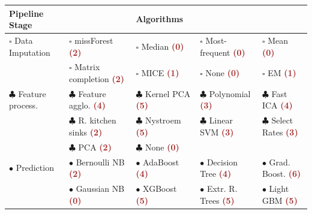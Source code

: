 \documentclass [PhD] {uclathes}
\begin{document}
\begin{table}[t]%
\centering
\begin{tabular}{|l||llll|}
\hline
{\bf {\footnotesize Pipeline Stage}} & & {\footnotesize {\bf Algorithms}}& &   \\
\hline
\hline
{\tiny \bf $\square$} {\footnotesize Data Imputation} & {\tiny $\square$} {\footnotesize missForest {\bf \textcolor{brown}{(2)}}} & {\tiny $\square$} {\footnotesize Median {\bf \textcolor{brown}{(0)}}} & {\tiny $\square$} {\footnotesize Most-frequent {\bf \textcolor{brown}{(0)}}} & {\tiny $\square$} {\footnotesize Mean {\bf \textcolor{brown}{(0)}}}   \\
& {\tiny $\square$} {\footnotesize Matrix completion {\bf \textcolor{brown}{(2)}}} & {\tiny $\square$} {\footnotesize MICE {\bf \textcolor{brown}{(1)}}} & {\tiny $\square$} {\footnotesize None {\bf \textcolor{brown}{(0)}}} & {\tiny $\square$} {\footnotesize EM {\bf \textcolor{brown}{(1)}}}  \\
\hline \hline
{\tiny $\clubsuit$} {\footnotesize Feature process.} & {\tiny $\clubsuit$} {\footnotesize Feature agglo. {\bf \textcolor{brown}{(4)}}} & {\tiny $\clubsuit$} {\footnotesize Kernel PCA {\bf \textcolor{brown}{(5)}}} & {\tiny $\clubsuit$} {\footnotesize Polynomial {\bf \textcolor{brown}{(3)}}} & {\tiny $\clubsuit$} {\footnotesize Fast ICA {\bf \textcolor{brown}{(4)}}}   \\
& {\tiny $\clubsuit$} {\footnotesize R. kitchen sinks {\bf \textcolor{brown}{(2)}}} & {\tiny $\clubsuit$} {\footnotesize Nystroem {\bf \textcolor{brown}{(5)}}} & {\tiny $\clubsuit$} {\footnotesize Linear SVM {\bf \textcolor{brown}{(3)}}} & {\tiny $\clubsuit$} {\footnotesize Select Rates {\bf \textcolor{brown}{(3)}}}  \\
& {\tiny $\clubsuit$} {\footnotesize PCA {\bf \textcolor{brown}{(2)}}} & {\tiny $\clubsuit$} {\footnotesize None {\bf \textcolor{brown}{(0)}}} & &  \\ 
\hline \hline
{\footnotesize $\bullet$ Prediction} & {\footnotesize $\bullet$ Bernoulli NB {\bf \textcolor{brown}{(2)}}} & {\footnotesize $\bullet$ AdaBoost {\bf \textcolor{brown}{(4)}}} & {\footnotesize $\bullet$ Decision Tree {\bf \textcolor{brown}{(4)}}} & {\footnotesize $\bullet$ Grad. Boost. {\bf \textcolor{brown}{(6)}}}  \\
 & {\footnotesize $\bullet$ Gaussian NB {\bf \textcolor{brown}{(0)}}} & {\footnotesize $\bullet$ XGBoost {\bf \textcolor{brown}{(5)}}} & {\footnotesize $\bullet$ Extr. R. Trees {\bf \textcolor{brown}{(5)}}} & {\footnotesize $\bullet$ Light GBM {\bf \textcolor{brown}{(5)}}}  \\

\end{tabular}
\end{table}
\end{document}
